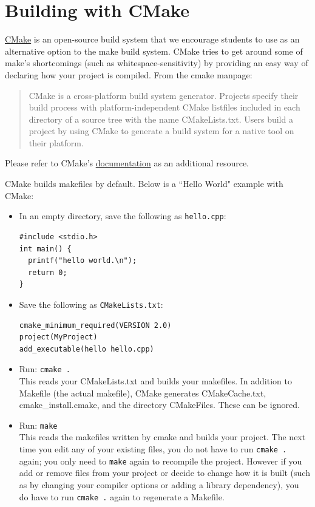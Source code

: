 \section{Building with CMake}

\label{sec:3_cmake}

\href{http://www.cmake.org/}{CMake} is an open-source build system that we encourage students to use as an alternative option to the make build system. CMake tries to get around some of make's shortcomings (such as whitespace-sensitivity) by providing an easy way of declaring how your project is compiled. From the cmake manpage:

\begin{quote}
CMake is a cross-platform build system generator. Projects specify their build process with platform-independent CMake listfiles included in each directory of a source tree with the name CMakeLists.txt. Users build a project by using CMake to generate a build system for a native tool on their platform.
\end{quote}

Please refer to CMake's \href{http://www.cmake.org/cmake/help/cmake2.6docs.html}{documentation} as an additional resource.

\noindent
CMake builds makefiles by default. Below is a ``Hello World" example with CMake:

\begin{itemize}
\item In an empty directory, save the following as \texttt{hello.cpp}:
\begin{verbatim}
#include <stdio.h>
int main() {
  printf("hello world.\n");
  return 0;
}
\end{verbatim}

\item Save the following as \texttt{CMakeLists.txt}:
\begin{verbatim}
cmake_minimum_required(VERSION 2.0)
project(MyProject)
add_executable(hello hello.cpp)
\end{verbatim}

\item Run: \texttt{cmake .}\\
This reads your CMakeLists.txt and builds your makefiles. In addition to Makefile (the actual makefile), CMake generates CMakeCache.txt, cmake\_install.cmake, and the directory CMakeFiles. These can be ignored.

\item Run: \texttt{make}\\
This reads the makefiles written by cmake and builds your project. The next time you edit any of your existing files, you do not have to run \texttt{cmake .} again; you only need to \texttt{make} again to recompile the project. However if you add or remove files from your project or decide to change how it is built (such as by changing your compiler options or adding a library dependency), you do have to run \texttt{cmake .} again to regenerate a Makefile.

\end{itemize}

